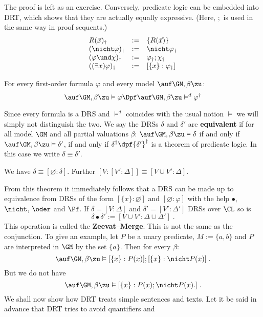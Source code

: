 The proof is left as an exercise. Conversely, predicate logic can
be embedded into DRT, which shows that they are actually equally 
expressive.  (Here, $;$ is used in the same way in proof sequents.)
$$\begin{array}{l@{\quad := \quad}l}
R(\vec{x})_{\dagger} & \{R(\vec{x})\} \\
(\nicht \varphi)_{\dagger} & \nicht \varphi_{\dagger} \\
(\varphi \und \chi)_{\dagger} & \varphi_{\dagger};
    \chi_{\dagger} \\
((\exists x)\varphi)_{\dagger} & [\{x\} : \varphi_{\dagger}]
\end{array}$$
\begin{prop}
\label{prop:foldrt}
For every first-order formula $\varphi$ and every model
$\auf \GM, \beta\zu$:
$$\auf \GM, \beta\zu \vDash \varphi \Dpf
\auf \GM, \beta\zu\vDash^d \varphi^{\dagger}$$
\end{prop}
Since every formula is a DRS and $\vDash^d$ coincides with the
usual notion $\vDash$ we will simply not distinguish
the two. We say the DRSs $\delta$ and $\delta'$ are
{\bf equivalent} if for all model $\GM$ and all
partial valuations $\beta$: $\auf \GM, \beta\zu \vDash \delta$
if and only if $\auf \GM, \beta\zu \vDash \delta'$, if and only
if $\delta^{\dagger} \dpf {\delta'}^{\dagger}$ is a theorem
of predicate logic. In this case
we write $\delta \equiv \delta'$.
\begin{prop}
We have $\delta \equiv [\varnothing : \delta]$. Further
$[V : [V' : \Delta]] \equiv [V \cup V' : \Delta]$.
\end{prop}
From this theorem it immediately follows that a DRS can be
made up to equivalence from DRSs of the form $[\{x\} : \varnothing]$
and $[\varnothing : \varphi]$ with the help $\bullet$, $\nicht$,
$\oder$ and $\Pf$. If $\delta = [V : \Delta]$ and $\delta' = %
[V' : \Delta']$ DRSs over $\CL$ so is
$$\delta \bullet \delta' := [V \cup V' :
\Delta \cup \Delta']\; .$$
This operation is called the {\bf Zeevat--Merge}. This is not
the same as the conjunction. To give an example, let $P$ be
a unary predicate, $M := \{a,b\}$ and $P$ are interpreted in
$\GM$ by the set $\{a\}$. Then for every $\beta$:
$$\auf \GM, \beta\zu \vDash [\{x\} : P(x)]; [\{x\} : \nicht P(x)]\; .$$
But we do not have
$$\auf \GM, \beta\zu \vDash [\{x\} : P(x); \nicht P(x).] \; .$$
We shall now show how DRT treats simple sentences and texts. Let it
be said in advance that DRT tries to avoid quantifiers and
